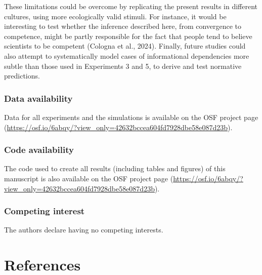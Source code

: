 \documentclass[
  doc,floatsintext]{apa6}
\begin{document}
These limitations could be overcome by replicating the present results in different cultures, using more ecologically valid stimuli. For instance, it would be interesting to test whether the inference described here, from convergence to competence, might be partly responsible for the fact that people tend to believe scientists to be competent (Cologna et al., 2024). Finally, future studies could also attempt to systematically model cases of informational dependencies more subtle than those used in Experiments 3 and 5, to derive and test normative predictions.

\subsubsection{Data availability}\label{data-availability}

Data for all experiments and the simulations is available on the OSF project page (\url{https://osf.io/6abqy/?view_only=42632bccea604fd7928dbe58e087d23b}).

\subsubsection{Code availability}\label{code-availability}

The code used to create all results (including tables and figures) of this manuscript is also available on the OSF project page (\url{https://osf.io/6abqy/?view_only=42632bccea604fd7928dbe58e087d23b}).

\subsubsection{Competing interest}\label{competing-interest}

The authors declare having no competing interests.

\FloatBarrier

\section{References}\label{references}
\end{document}
